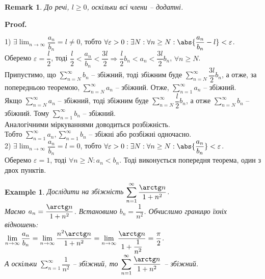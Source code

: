 \documentclass[a4paper, 10pt]{article}
\makeatletter
\def\huge{\displaystyle}
\theoremstyle{theoremdd}
\theoremstyle{theoremdd}
\theoremstyle{theoremdd}
\theoremstyle{theoremdd}
\theoremstyle{theoremdd}
\newtheorem{example}[theorem]{Example}
\theoremstyle{theoremdd}
\theoremstyle{theoremdd}
\newtheorem{remark}[theorem]{Remark}
\theoremstyle{theoremdd}
\theoremstyle{theoremdd}
\renewenvironment{proof}[1][Proof.\\]{\par
\pushQED{\hfill \qed}%
\normalfont \topsep6\p@\@plus6\p@\relax
\trivlist
\item\relax
{\bfseries
#1\@addpunct{.}}\hspace\labelsep\ignorespaces
}{%
\popQED\endtrivlist\@endpefalse
}
\makeatother
\begin{document}
\begin{remark}
До речі, $l \geq 0$, оскільки всі члени -- додатні.
\end{remark}

\begin{proof}
1) $\exists \huge \lim_{n \to \infty} \dfrac{a_n}{b_n} = l \neq 0$, тобто $\forall \varepsilon > 0: \exists N: \forall n \geq N: \abs{\dfrac{a_n}{b_n}-l} < \varepsilon$.\\
Оберемо $\varepsilon = \dfrac{l}{2}$, тоді $\dfrac{l}{2} < \dfrac{a_n}{b_n} < \dfrac{3l}{2} \Rightarrow \dfrac{l}{2}b_n < a_n < \dfrac{3l}{2} b_n$, $\forall n \geq N$.\\
Припустимо, що $\huge \sum_{n=N}^{\infty} b_n$ -- збіжний, тоді збіжним буде $\huge \sum_{n=N}^{\infty} \dfrac{3l}{2} b_n$, а отже, за попередньою теоремою, $\huge \sum_{n=N}^{\infty} a_n$ -- збіжний. Отже, $\huge\sum_{n=1}^\infty a_n$ -- збіжний.\\
Якщо $\huge\sum_{n = N}^\infty a_n$ -- збіжний, тоді збіжним буде $\huge\sum_{n = N}^\infty \dfrac{l}{2} b_n$, а отже $\huge\sum_{n=N}^\infty b_n$ -- збіжний. Тому $\huge\sum_{n=1}^\infty b_n$ -- збіжний.\\
Аналогічними міркуваннями доводиться розбіжність.\\
Тобто $\huge\sum_{n=1}^\infty a_n, \huge\sum_{n=1}^\infty b_n$ -- збіжні або розбіжні одночасно.
\bigskip \\
2) $\exists \huge \lim_{n \to \infty} \dfrac{a_n}{b_n} = l = 0$, тобто $\forall \varepsilon > 0: \exists N: \forall n \geq N: \abs{\dfrac{a_n}{b_n}} < \varepsilon$.\\
Оберемо $\varepsilon = 1$, тоді $\forall n \geq N: a_n < b_n$. Тоді виконується попередня теорема, один з двох пунктів.
\end{proof}

\begin{example}
Дослідити на збіжність $\huge\sum_{n=1}^\infty \dfrac{\arctg n}{1+n^2}$.\\
Маємо $a_n = \dfrac{\arctg n}{1+n^2}$. Встановимо $b_n = \dfrac{1}{n^2}$. Обчислимо границю їхніх відношень:\\
$\huge\lim_{n \to \infty} \dfrac{a_n}{b_n} = \lim_{n \to \infty} \dfrac{n^2 \arctg n}{1+n^2} = \lim_{n \to \infty} \dfrac{\arctg n}{1 + \dfrac{1}{n^2}} = \dfrac{\pi}{2}$.\\
А оскільки $\huge\sum_{n=1}^\infty \dfrac{1}{n^2}$ -- збіжний, то $\huge\sum_{n=1}^\infty \dfrac{\arctg n}{1+n^2}$ -- збіжний.
\end{example}
\end{document}

